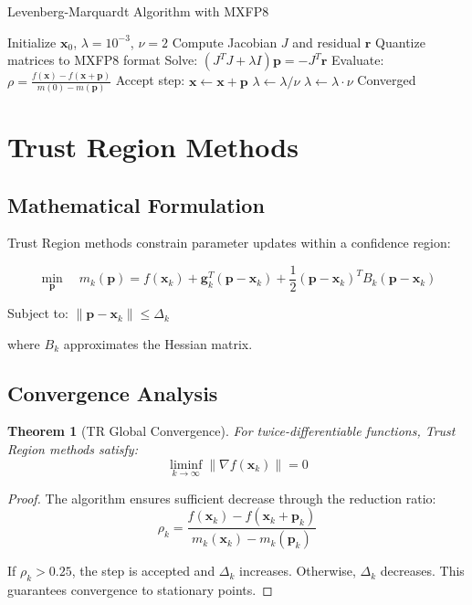 \documentclass[11pt,a4paper]{article}
\newtheorem{theorem}{Theorem}[section]
\newtheorem{proof}{Proof}
\begin{document}
\begin{algorithm}[H]
\caption{Levenberg-Marquardt Algorithm with MXFP8}
\label{alg:lm}
\begin{algorithmic}[1]
\State Initialize $\mathbf{x}_0$, $\lambda = 10^{-3}$, $\nu = 2$
    \State Compute Jacobian $J$ and residual $\mathbf{r}$
    \State \textcolor{mxfp8color}{Quantize matrices to MXFP8 format}
    \State Solve: $(J^T J + \lambda I) \mathbf{p} = -J^T \mathbf{r}$
    \State Evaluate: $\rho = \frac{f(\mathbf{x}) - f(\mathbf{x} + \mathbf{p})}{m(0) - m(\mathbf{p})}$
        \State Accept step: $\mathbf{x} \leftarrow \mathbf{x} + \mathbf{p}$
        \State $\lambda \leftarrow \lambda / \nu$
    \Else
        \State $\lambda \leftarrow \lambda \cdot \nu$
    \EndIf
        \State Converged
    \EndIf
\EndWhile
\end{algorithmic}
\end{algorithm}

\section{Trust Region Methods}

\subsection{Mathematical Formulation}

Trust Region methods constrain parameter updates within a confidence region:

\[\min_{\mathbf{p}} \quad m_k(\mathbf{p}) = f(\mathbf{x}_k) + \mathbf{g}_k^T (\mathbf{p} - \mathbf{x}_k) + \frac{1}{2} (\mathbf{p} - \mathbf{x}_k)^T B_k (\mathbf{p} - \mathbf{x}_k)\]

Subject to: $\|\mathbf{p} - \mathbf{x}_k\| \leq \Delta_k$

where $B_k$ approximates the Hessian matrix.

\subsection{Convergence Analysis}

\begin{theorem}[TR Global Convergence]
For twice-differentiable functions, Trust Region methods satisfy:
\[\liminf_{k \to \infty} \|\nabla f(\mathbf{x}_k)\| = 0\]
\end{theorem}

\begin{proof}
The algorithm ensures sufficient decrease through the reduction ratio:
\[\rho_k = \frac{f(\mathbf{x}_k) - f(\mathbf{x}_k + \mathbf{p}_k)}{m_k(\mathbf{x}_k) - m_k(\mathbf{p}_k)}\]

If $\rho_k > 0.25$, the step is accepted and $\Delta_k$ increases. Otherwise, $\Delta_k$ decreases. This guarantees convergence to stationary points.
\end{proof}
\end{document}
